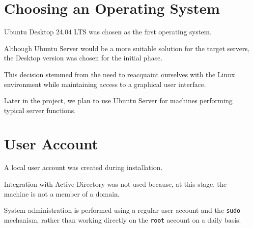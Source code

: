\section{Choosing an Operating System}

Ubuntu Desktop 24.04 LTS was chosen as the first operating system.

Although Ubuntu Server would be a more suitable solution
for the target servers, the Desktop version was chosen for the initial phase.

This decision stemmed from the need to reacquaint ourselves with the
Linux environment while maintaining access to a graphical
user interface.

Later in the project, we plan to use Ubuntu Server
for machines performing typical server functions.

\section{User Account}

A local user account was created during installation.

Integration with Active Directory was not used because, at this
stage, the machine is not a member of a domain.

System administration is performed using a regular user account
and the \texttt{sudo} mechanism, rather than working directly
on the \texttt{root} account on a daily basis.